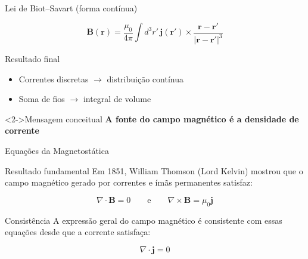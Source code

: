\documentclass[aspectratio=169]{beamer}
\begin{document}
\begin{frame}{Lei de Biot–Savart (forma contínua)}

\begin{equation}
\mathbf{B}(\mathbf r)=\frac{\mu_0}{4\pi}
\int d^3r'\,\mathbf j(\mathbf r')\times
\frac{\mathbf r-\mathbf r'}{|\mathbf r-\mathbf r'|^3}
\tag{2.26}
\end{equation}

\begin{alertblock}{Resultado final}
\begin{itemize}
\item Correntes discretas $\rightarrow$ distribuição contínua
\item Soma de fios $\rightarrow$ integral de volume
\end{itemize}
\end{alertblock}

\begin{block}<2->{Mensagem conceitual}
\centering
\textbf{A fonte do campo magnético é a densidade de corrente}
\end{block}

\end{frame}


\begin{frame}{Equações da Magnetostática}

\begin{block}{Resultado fundamental}
Em 1851, William Thomson (Lord Kelvin) mostrou que o campo magnético gerado por correntes e ímãs permanentes satisfaz:
\end{block}

\vspace{0.2cm}

\begin{equation}
\nabla \cdot \mathbf{B} = 0
\qquad \text{e} \qquad
\nabla \times \mathbf{B} = \mu_0 \mathbf{j}
\tag{2.27}
\end{equation}

\vspace{0.3cm}

\begin{alertblock}{Consistência}
A expressão geral do campo magnético é consistente com essas equações desde que a corrente satisfaça:
\end{alertblock}

\vspace{0.1cm}

\begin{equation}
\nabla \cdot \mathbf{j} = 0
\tag{2.28}
\end{equation}

\end{frame}
\end{document}
